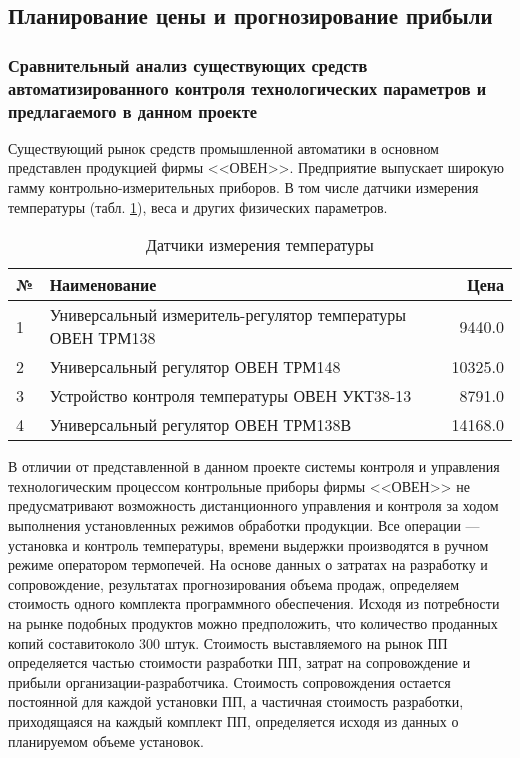 \subsection{Планирование цены и прогнозирование прибыли}
\subsubsection{Сравнительный анализ существующих средств автоматизированного контроля технологических параметров и предлагаемого в данном проекте}
Существующий рынок средств промышленной автоматики в основном представлен  продукцией фирмы <<ОВЕН>>.
Предприятие выпускает широкую гамму контрольно-измерительных приборов.
В том числе датчики измерения температуры (табл. \ref{table:temperatureSensors}), веса и других физических параметров.

\begin{table}[H]
\caption{Датчики измерения температуры}
\begin{tabular}{|l|p{14cm}|r|}
\hline{}
№ & Наименование & Цена \\
\hline{}
1 & Универсальный измеритель-регулятор температуры ОВЕН ТРМ138 & 9440.0 \\
\hline{}
2 & Универсальный регулятор ОВЕН ТРМ148 & 10325.0 \\
\hline{}
3 & Устройство контроля температуры ОВЕН УКТ38-13 & 8791.0 \\
\hline{}
4 & Универсальный регулятор ОВЕН ТРМ138В & 14168.0 \\
\hline
\end{tabular}
\label{table:temperatureSensors}
\end{table}

\begin{par}                                                                 
В отличии от представленной в данном проекте системы контроля и управления 
технологическим процессом контрольные приборы фирмы <<ОВЕН>> не предусматривают
возможность дистанционного управления и контроля за ходом выполнения установленных
режимов обработки продукции. Все операции --- установка и контроль температуры, времени выдержки 
производятся в ручном режиме оператором термопечей. На основе данных  о затратах на разработку и
сопровождение, результатах прогнозирования объема продаж, определяем стоимость одного комплекта
программного обеспечения. Исходя из потребности на рынке подобных продуктов
можно предположить, что количество проданных копий составитоколо 300 штук. Стоимость выставляемого
на рынок ПП определяется частью стоимости разработки ПП, затрат на сопровождение и прибыли
организации-разработчика. Стоимость сопровождения остается постоянной для каждой установки
ПП, а частичная стоимость разработки, приходящаяся на каждый комплект ПП,
определяется исходя из данных о планируемом объеме установок.
\end{par}


